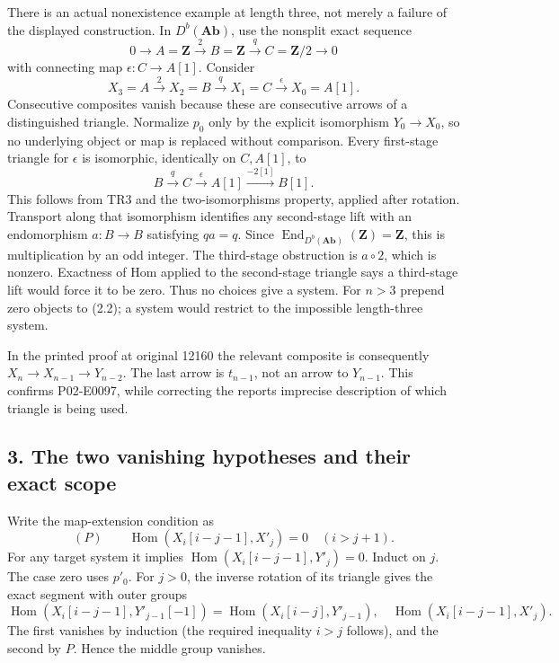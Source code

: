\documentclass[11pt]{article}
\begin{document}
There is an actual nonexistence example at length three,\allowbreak{} not merely a failure of the displayed construction. In \(D^b(\mathbf{Ab})\),\allowbreak{} use the nonsplit exact sequence \[
0\to A=\mathbf Z\xrightarrow{2}B=\mathbf Z
 \xrightarrow{q}C=\mathbf Z/2\to0
\] with connecting map \(\epsilon:C\to A[1]\). Consider \[
X_3=A\xrightarrow{2}X_2=B\xrightarrow{q}X_1=C
 \xrightarrow{\epsilon}X_0=A[1]. \tag{2.2}
\] Consecutive composites vanish because these are consecutive arrows of a distinguished triangle. Normalize \(p_0\) only by the explicit isomorphism \(Y_0\to X_0\),\allowbreak{} so no underlying object or map is replaced without comparison. Every first-stage triangle for \(\epsilon\) is isomorphic,\allowbreak{} identically on \(C,A[1]\),\allowbreak{} to \[
B\xrightarrow{q}C\xrightarrow{\epsilon}A[1]
 \xrightarrow{-2[1]}B[1].
\] This follows from TR3 and the two-isomorphisms property,\allowbreak{} applied after rotation. Transport along that isomorphism identifies any second-stage lift with an endomorphism \(a:B\to B\) satisfying \(qa=q\). Since \(\operatorname{End}_{D^b(\mathbf{Ab})}(\mathbf Z)=\mathbf Z\),\allowbreak{} this is multiplication by an odd integer. The third-stage obstruction is \(a\circ2\),\allowbreak{} which is nonzero. Exactness of Hom applied to the second-stage triangle says a third-stage lift would force it to be zero. Thus no choices give a system. For \(n>3\) prepend zero objects to (2.2)\allowbreak{}; a system would restrict to the impossible length-three system.

In the printed proof at original 12160 the relevant composite is consequently \(X_n\to X_{n-1}\to Y_{n-2}\). The last arrow is \(t_{n-1}\),\allowbreak{} not an arrow to \(Y_{n-1}\). This confirms P02-E0097,\allowbreak{} while correcting the report\textquotesingle s imprecise description of which triangle is being used.

\subsection{3. The two vanishing hypotheses and their exact scope}\label{proofs-12008-12370-the-two-vanishing-hypotheses-and-their-exact-scope}

Write the map-extension condition as \[
(P)\qquad \operatorname{Hom}(X_i[i-j-1],X'_j)=0
 \quad(i>j+1).
\] For any target system it implies \(\operatorname{Hom}(X_i[i-j-1],Y'_j)=0\). Induct on \(j\). The case zero uses \(p'_0\). For \(j>0\),\allowbreak{} the inverse rotation of its triangle gives the exact segment with outer groups \[
\operatorname{Hom}(X_i[i-j-1],Y'_{j-1}[-1])
 =\operatorname{Hom}(X_i[i-j],Y'_{j-1}),\quad
\operatorname{Hom}(X_i[i-j-1],X'_j).
\] The first vanishes by induction (the required inequality \(i>j\) follows)\allowbreak{},\allowbreak{} and the second by \(P\). Hence the middle group vanishes.
\end{document}
